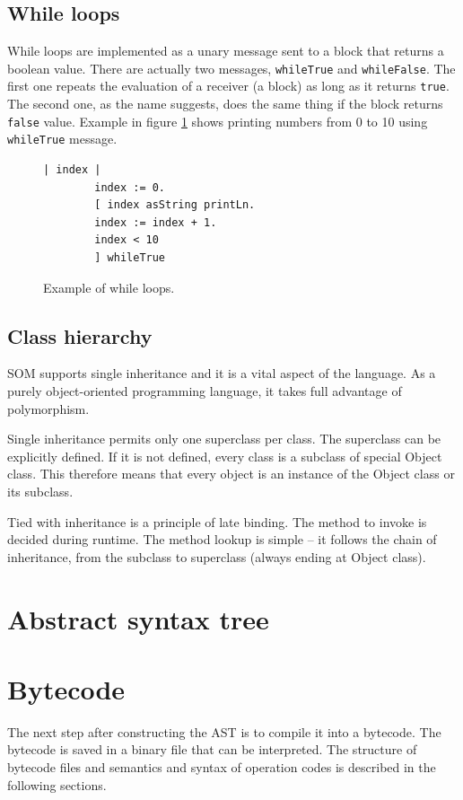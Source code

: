 \documentclass[thesis=M,english]{FITthesis}[2019/12/23]
\begin{document}
\subsection{While loops}
While loops are implemented as a unary message sent to a block that returns a boolean value. There are actually
two messages, \texttt{whileTrue} and \texttt{whileFalse}. The first one repeats the evaluation of a receiver (a block)
as long as it returns \texttt{true}. The second one, as the name suggests, does the same thing if the block returns
\texttt{false} value. Example in figure \ref{lst-while} shows printing numbers from 0 to 10 using \texttt{whileTrue}
message.

\begin{figure}[h!]
	\begin{lstlisting}[language=Smalltalk]
		| index |
		index := 0.
		[ index asString printLn.
		index := index + 1.
		index < 10
		] whileTrue
	\end{lstlisting}
	\caption{Example of while loops.}
	\label{lst-while}
\end{figure}

\subsection{Class hierarchy}
SOM supports single inheritance and it is a vital aspect of the language. As a purely object-oriented programming language,
it takes full advantage of polymorphism.

Single inheritance permits only one superclass per class. The superclass can be explicitly defined. If it is not defined,
every class is a subclass of special Object class. This therefore means that every object is an instance of the Object class
or its subclass.

Tied with inheritance is a principle of late binding. The method to invoke is decided during runtime. The method lookup is simple
-- it follows the chain of inheritance, from the subclass to superclass (always ending at Object class). 

\section{Abstract syntax tree}

\section{Bytecode}
The next step after constructing the AST is to compile it into a bytecode. The bytecode is saved in a binary file that can be
interpreted. The structure of bytecode files and semantics and syntax of operation codes is described in the following sections.
\end{document}

